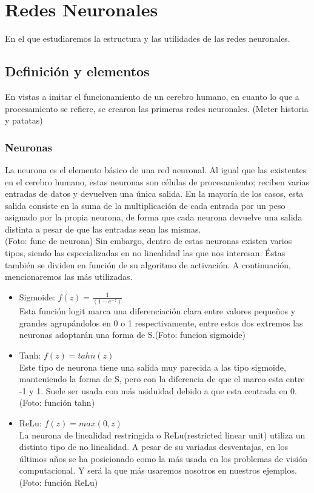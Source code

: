 \chapter{Redes Neuronales}
\label{cap:neuralnetworks}

En el que estudiaremos la estructura y las utilidades de las redes neuronales. 

\chapterquote{}{}

\section{Definición y elementos}
En vistas a imitar el funcionamiento de un cerebro humano, en cuanto lo que a procesamiento se refiere, se crearon las primeras redes neuronales. (Meter historia y patatas)

\subsection{Neuronas}
La neurona es el elemento básico de una red neuronal. Al igual que las existentes en el cerebro humano, estas neuronas son células de procesamiento; reciben varias entradas de datos y devuelven una única salida. En la mayoría de los casos, esta salida consiste en la suma de la multiplicación de cada entrada por un peso asignado por la propia neurona, de forma que cada neurona devuelve una salida distinta a pesar de que las entradas sean las mismas. \\
(Foto: func de neurona)
Sin embargo, dentro de estas neuronas existen varios tipos, siendo las especializadas en no linealidad las que nos interesan. Éstas también se dividen en función de su algoritmo de activación. A continuación, mencionaremos las más utilizadas.

\begin{itemize}
    \item Sigmoide: $f(z) = \frac{1}{(1-e^{-z})}$\\
    Esta función logit marca una diferenciación clara entre valores pequeños y grandes agrupándolos en 0 o 1 respectivamente, entre estos dos extremos las neuronas adoptarán una forma de S.(Foto: funcion sigmoide)
    \item Tanh: $f(z)= tahn(z)$\\
    Este tipo de neurona tiene una salida muy parecida a las tipo sigmoide, manteniendo la forma de S, pero con la diferencia de que el marco esta entre -1 y 1. Suele ser usada con más asiduidad debido a que esta centrada en 0.(Foto: función tahn)
    \item ReLu: $f(z) = max(0,z)$\\
    La neurona de linealidad restringida o ReLu(restricted linear unit) utiliza un distinto tipo de no linealidad. A pesar de su variadas desventajas, en los últimos años se ha posicionado como la más usada en los problemas de visión computacional. Y será la que más usaremos nosotros en nuestros ejemplos. (Foto: función ReLu)
\end{itemize}

